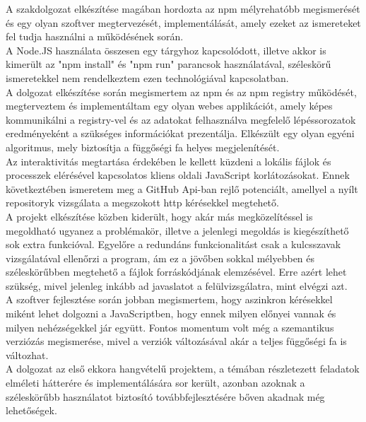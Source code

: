 
A szakdolgozat elkészítése magában hordozta az npm mélyrehatóbb megismerését és egy olyan szoftver megtervezését, implementálását, amely ezeket az ismereteket fel tudja használni a működésének során.\\

A Node.JS használata összesen egy tárgyhoz kapcsolódott, illetve akkor is kimerült az "npm install" és "npm run" parancsok használatával, széleskörű ismeretekkel nem rendelkeztem ezen technológiával kapcsolatban.\\

A dolgozat elkészítése során megismertem az npm és az npm registry működését, megterveztem és implementáltam egy olyan webes applikációt, amely képes kommunikálni a registry-vel és az adatokat felhasználva megfelelő lépéssorozatok eredményeként a szükséges információkat prezentálja. Elkészült egy olyan egyéni algoritmus, mely biztosítja a függőségi fa helyes megjelenítését.\\

Az interaktivitás megtartása érdekében le kellett küzdeni a lokális fájlok és processzek elérésével kapcsolatos kliens oldali JavaScript korlátozásokat. Ennek következtében ismeretem meg a GitHub Api-ban rejlő potenciált, amellyel a nyílt repositoryk vizsgálata a megszokott http kérésekkel megtehető.\\

A projekt elkészítése közben kiderült, hogy akár más megközelítéssel is megoldható ugyanez a problémakör, illetve a jelenlegi megoldás is kiegészíthető sok extra funkcióval. Egyelőre a redundáns funkcionalitást csak a kulcsszavak vizsgálatával ellenőrzi a program, ám ez a jövőben sokkal mélyebben és széleskörűbben megtehető a fájlok forráskódjának elemzésével. Erre azért lehet szükség, mivel jelenleg inkább ad javaslatot a felülvizsgálatra, mint elvégzi azt.\\

A szoftver fejlesztése során jobban megismertem, hogy aszinkron kérésekkel miként lehet dolgozni a JavaScriptben, hogy ennek milyen előnyei vannak és milyen nehézségekkel jár együtt. Fontos momentum volt még a szemantikus verziózás megismerése, mivel a verziók változásával akár a teljes függőségi fa is változhat.\\

A dolgozat az első ekkora hangvételű projektem, a témában részletezett feladatok elméleti hátterére és implementálására sor került, azonban azoknak a széleskörűbb használatot biztosító továbbfejlesztésére bőven akadnak még lehetőségek.

 



